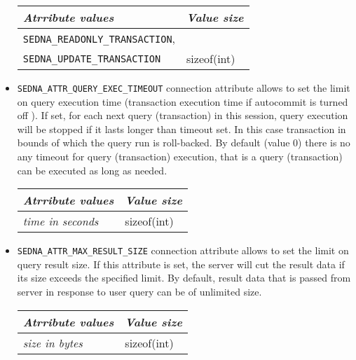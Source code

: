 \documentclass[a4paper,12pt]{article}
\begin{document}
\begin{itemize}
\begin{tabular}{|l|l|}
\hline
\emph{Atrribute values} & \emph{Value size} \\
\hline
\verb!SEDNA_READONLY_TRANSACTION!, & \\
\verb!SEDNA_UPDATE_TRANSACTION! & sizeof(int) \\
\hline
\end{tabular}

\item\verb!SEDNA_ATTR_QUERY_EXEC_TIMEOUT! connection attribute allows to set the
limit on query execution time (transaction execution time if autocommit is
turned off ). If set, for each next query (transaction) in this session,
query execution will be stopped if it lasts longer than timeout set. In this
case transaction in bounds of which the query run is roll-backed. By default
(value 0) there is no any timeout for query (transaction) execution, that is a
query (transaction) can be executed as long as needed.

\begin{tabular}{|l|l|}
\hline
\emph{Atrribute values} & \emph{Value size} \\
\hline
\emph{time in seconds} & sizeof(int) \\
\hline
\end{tabular}

\item\verb!SEDNA_ATTR_MAX_RESULT_SIZE! connection attribute allows to set the
limit on query result size. If this attribute is set, the server will cut the
result data if its size exceeds the specified limit. By default, result data
that is passed from server in response to user query can be of unlimited size.

\begin{tabular}{|l|l|}
\hline
\emph{Atrribute values} & \emph{Value size} \\
\hline
\emph{size in bytes} & sizeof(int) \\
\hline
\end{tabular}


\end{itemize}
\end{document}
